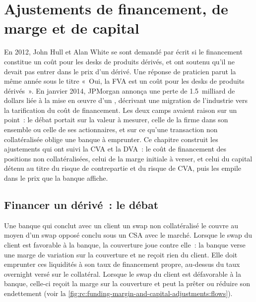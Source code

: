 \chapter{Ajustements de financement, de marge et de capital}\label{ch:rc:funding-margin-and-capital-adjustments}

En 2012, John Hull et Alan White se sont demandé par écrit si le financement constitue un coût pour les
desks de produits dérivés, et ont soutenu qu'il ne devait pas entrer dans le prix d'un dérivé. Une réponse de praticien
parut la même année sous le titre «~Oui, la FVA est un coût pour les desks de produits dérivés~». En janvier
2014, JPMorgan annonça une perte de 1.5~milliard de dollars liée à la mise en œuvre d'un ,
décrivant une migration de l'industrie vers la tarification du coût de financement. Les deux camps avaient raison sur un point~: le débat portait sur la
valeur à mesurer, celle de la firme dans son ensemble ou celle de ses actionnaires, et sur ce
qu'une transaction non collatéralisée oblige une banque à emprunter. Ce chapitre construit les ajustements qui
ont suivi la CVA et la DVA~: le coût de financement des positions non collatéralisées, celui de la marge initiale
à verser, et celui du capital détenu au titre du risque de contrepartie et du risque de CVA, puis les empile dans le
prix que la banque affiche.

\section{Financer un dérivé~: le débat}

Une banque qui conclut avec un client un swap non collatéralisé le couvre au moyen d'un swap opposé
conclu sous un CSA avec le marché. Lorsque le swap du client est favorable à la banque, la
couverture joue contre elle~: la banque verse une marge de variation sur la couverture et ne reçoit rien du
client. Elle doit emprunter ces liquidités à son taux de financement propre, au-dessus du taux overnight versé sur le
collatéral. Lorsque le swap du client est défavorable à la banque, celle-ci reçoit la marge sur
la couverture et peut la prêter ou réduire son endettement
(voir la \cref{fig:rc:funding-margin-and-capital-adjustments:flows}).

